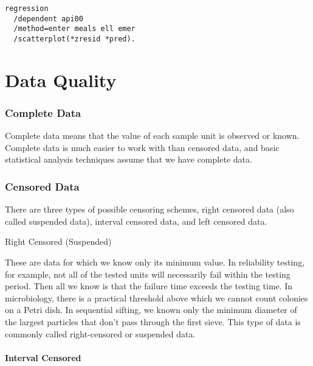 \documentclass[12pt, a4paper]{report}
\begin{document}
\begin{verbatim}
regression
  /dependent api00
  /method=enter meals ell emer
  /scatterplot(*zresid *pred).
\end{verbatim}




\chapter{Data Quality}


\subsection{Complete Data}

Complete data means that the value of each sample unit is observed or known. Complete data is much easier to work with than censored data, and basic statistical analysis techniques assume that we have complete data.


\subsection{Censored Data}

There are three types of possible censoring schemes, right censored data (also called suspended data), interval censored data, and left censored data.



Right Censored (Suspended)

These are data for which we know only its minimum value. In reliability testing, for example, not all of the tested units will necessarily fail within the testing period. Then all we know is that the failure time exceeds the testing time. In microbiology, there is a practical threshold above which we cannot count colonies on a Petri dish. In sequential sifting, we known only the minimum diameter of the largest particles that don't pass through the first sieve. This type of data is commonly called right-censored or suspended data.


\subsubsection{Interval Censored}
\end{document}
